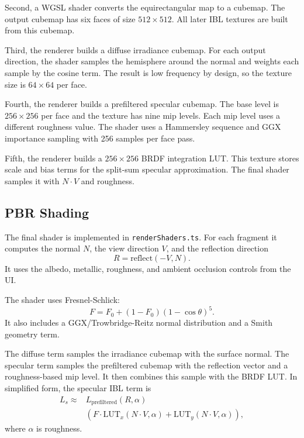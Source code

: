 \documentclass{egpubl}
\newcommand{\code}[1]{{\scriptsize\texttt{#1}}}
\begin{document}
Second, a WGSL shader converts the equirectangular map to a cubemap.
The output cubemap has six faces of size $512 \times 512$.
All later IBL textures are built from this cubemap.

Third, the renderer builds a diffuse irradiance cubemap.
For each output direction, the shader samples the hemisphere around the normal and weights each sample by the cosine term.
The result is low frequency by design, so the texture size is $64 \times 64$ per face.

Fourth, the renderer builds a prefiltered specular cubemap.
The base level is $256 \times 256$ per face and the texture has nine mip levels.
Each mip level uses a different roughness value.
The shader uses a Hammersley sequence and GGX importance sampling with 256 samples per face pass.

Fifth, the renderer builds a $256 \times 256$ BRDF integration LUT.
This texture stores scale and bias terms for the split-sum specular approximation.
The final shader samples it with $N \cdot V$ and roughness.

\subsection{PBR Shading}

The final shader is implemented in \code{renderShaders.ts}.
For each fragment it computes the normal $N$, the view direction $V$, and the reflection direction
\begin{equation}
    R = \mathrm{reflect}(-V, N).
\end{equation}
It uses the albedo, metallic, roughness, and ambient occlusion controls from the UI.

The shader uses Fresnel-Schlick:
\begin{equation}
    F = F_0 + (1 - F_0)(1 - \cos\theta)^5 .
\end{equation}
It also includes a GGX/Trowbridge-Reitz normal distribution and a Smith geometry term.

The diffuse term samples the irradiance cubemap with the surface normal.
The specular term samples the prefiltered cubemap with the reflection vector and a roughness-based mip level.
It then combines this sample with the BRDF LUT.
In simplified form, the specular IBL term is
\begin{equation}
    \begin{split}
        L_s \approx {} & L_{\mathrm{prefiltered}}(R, \alpha)              \\
                       & \left(F \cdot \mathrm{LUT}_x(N \cdot V,\alpha) +
        \mathrm{LUT}_y(N \cdot V,\alpha)\right),
    \end{split}
\end{equation}
where $\alpha$ is roughness.
\end{document}
